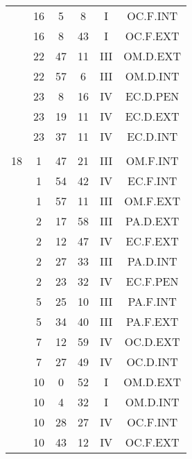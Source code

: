 \documentclass[12pt, a4paper]{article}
\begin{document}
\begin{multicols}{3}
{\begin{tabular}{c c c c c c}
	 	 	 	 & 16 & 5 & 8 & I & OC.F.INT\\%
	 	 	 	 & 16 & 8 & 43 & I & OC.F.EXT\\%
	 	 	 	 & 22 & 47 & 11 & III & OM.D.EXT\\%
	 	 	 	 & 22 & 57 & 6 & III & OM.D.INT\\%
	 	 	 	 & 23 & 8 & 16 & IV & EC.D.PEN\\%
	 	 	 	 & 23 & 19 & 11 & IV & EC.D.EXT\\%
	 	 	 	 & 23 & 37 & 11 & IV & EC.D.INT\\%
	 	 	 	 & & & & & \\%
	 	 	 	18 & 1 & 47 & 21 & III & OM.F.INT\\%
	 	 	 	 & 1 & 54 & 42 & IV & EC.F.INT\\%
	 	 	 	 & 1 & 57 & 11 & III & OM.F.EXT\\%
	 	 	 	 & 2 & 17 & 58 & III & PA.D.EXT\\%
	 	 	 	 & 2 & 12 & 47 & IV & EC.F.EXT\\%
	 	 	 	 & 2 & 27 & 33 & III & PA.D.INT\\%
	 	 	 	 & 2 & 23 & 32 & IV & EC.F.PEN\\%
	 	 	 	 & 5 & 25 & 10 & III & PA.F.INT\\%
	 	 	 	 & 5 & 34 & 40 & III & PA.F.EXT\\%
	 	 	 	 & 7 & 12 & 59 & IV & OC.D.EXT\\%
	 	 	 	 & 7 & 27 & 49 & IV & OC.D.INT\\%
	 	 	 	 & 10 & 0 & 52 & I & OM.D.EXT\\%
	 	 	 	 & 10 & 4 & 32 & I & OM.D.INT\\%
	 	 	 	 & 10 & 28 & 27 & IV & OC.F.INT\\%
	 	 	 	 & 10 & 43 & 12 & IV & OC.F.EXT\\%

\end{tabular}}
\end{multicols}
\end{document}
